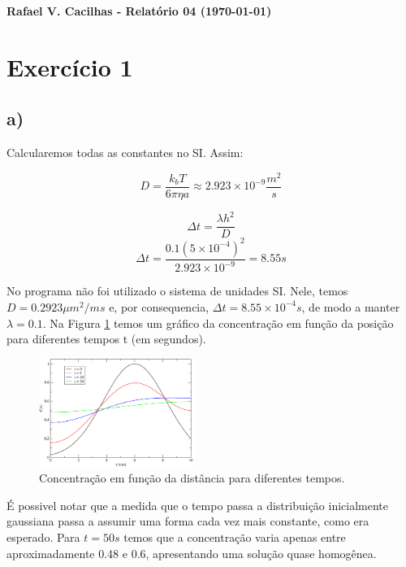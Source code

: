 \documentclass[a4wide]{report}
\begin{document}
\noindent
{\bf Rafael V. Cacilhas  - Relatório 04 (\today)}

\vspace{0.5cm}

\section*{Exercício 1}

\subsection*{a) }

Calcularemos todas as constantes no SI. Assim:


\begin{equation*}
D= \frac{k_b T}{6 \pi \eta a} \approx 2.923 \times 10^{-9} \frac{m^2}{s}
\end{equation*}

\begin{equation*}
\Delta t = \frac{\lambda h^2}{D} 
\end{equation*}
\begin{equation*}
\Delta t = \frac{0.1  \left( 5 \times 10 ^{-4} \right) ^2 }{2.923 \times 10^{-9} } = 8.55 s
\end{equation*}

No programa não foi utilizado o sistema de unidades SI. Nele, temos $D = 0.2923  \mu m^2/ms$ e, por consequencia, $\Delta t = 8.55 \times 10^{-4}s$, de modo a manter $\lambda = 0.1$. Na Figura \ref{1} temos um gráfico da concentração em função da posição para diferentes tempos t (em segundos).

\begin{figure}[!htb]
\centering
\includegraphics[width=0.447\textwidth]{c.pdf}
\caption{Concentração em função da distância para diferentes tempos.}
\label{1}
\end{figure}

É possivel notar que a medida que o tempo passa a distribuição inicialmente gaussiana passa a assumir uma forma cada vez mais constante, como era esperado. Para $t = 50s$ temos que a concentração varia apenas entre aproximadamente 0.48 e 0.6, apresentando uma solução quase homogênea.
\end{document}
